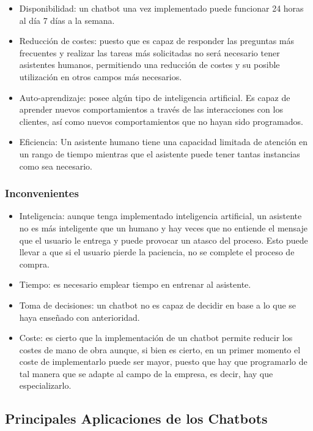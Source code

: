 \begin{itemize}
    \item Disponibilidad: un chatbot una vez implementado puede funcionar 24 horas al día 7 días a la semana.
    \item Reducción de costes: puesto que es capaz de responder las preguntas más frecuentes y realizar las tareas más solicitadas no será necesario tener asistentes humanos, permitiendo una reducción de costes y su posible utilización en otros campos más necesarios.
    \item Auto-aprendizaje: posee algún tipo de inteligencia artificial. Es capaz de aprender nuevos comportamientos a través de las interacciones con los clientes, así como nuevos comportamientos que no hayan sido programados. 
    \item Eficiencia: Un asistente humano tiene una capacidad limitada de atención en un rango de tiempo mientras que el asistente puede tener tantas instancias como sea necesario.
\end{itemize}



\subsubsection{Inconvenientes}

\begin{itemize}
    \item Inteligencia: aunque tenga implementado inteligencia artificial, un asistente no es más inteligente que un humano y hay veces que no entiende el mensaje que el usuario le entrega y puede provocar un atasco del proceso. Esto puede llevar a que si el usuario pierde la paciencia, no se complete el proceso de compra.
    \item Tiempo: es necesario emplear tiempo en entrenar al asistente.
    \item Toma de decisiones: un chatbot no es capaz de decidir en base a lo que se haya enseñado con anterioridad.
    \item Coste: es cierto que la implementación de un chatbot permite reducir los costes de mano de obra aunque, si bien es cierto, en un primer momento el coste de implementarlo puede ser mayor, puesto que hay que programarlo de tal manera que se adapte al campo de la empresa, es decir, hay que especializarlo.
\end{itemize}


\subsection{Principales Aplicaciones de los Chatbots}


